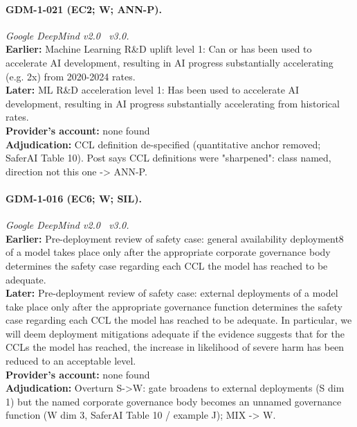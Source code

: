 \paragraph{GDM-1-021 (EC2; W; ANN-P).} \emph{Google DeepMind v2.0 \textrightarrow\ v3.0.}\\
\textbf{Earlier:} Machine Learning R\&D uplift level 1: Can or has been used to accelerate AI development, resulting in AI progress substantially accelerating (e.g. 2x) from 2020-2024 rates.\\
\textbf{Later:} ML R\&D acceleration level 1: Has been used to accelerate AI development, resulting in AI progress substantially accelerating from historical rates.\\
\textbf{Provider's account:} none found\\
\textbf{Adjudication:} CCL definition de-specified (quantitative anchor removed; SaferAI Table 10). Post says CCL definitions were "sharpened": class named, direction not this one -> ANN-P.

\paragraph{GDM-1-016 (EC6; W; SIL).} \emph{Google DeepMind v2.0 \textrightarrow\ v3.0.}\\
\textbf{Earlier:} Pre-deployment review of safety case: general availability deployment8 of a model takes place only after the appropriate corporate governance body determines the safety case regarding each CCL the model has reached to be adequate.\\
\textbf{Later:} Pre-deployment review of safety case: external deployments of a model take place only after the appropriate governance function determines the safety case regarding each CCL the model has reached to be adequate. In particular, we will deem deployment mitigations adequate if the evidence suggests that for the CCLs the model has reached, the increase in likelihood of severe harm has been reduced to an acceptable level.\\
\textbf{Provider's account:} none found\\
\textbf{Adjudication:} Overturn S->W: gate broadens to external deployments (S dim 1) but the named corporate governance body becomes an unnamed governance function (W dim 3, SaferAI Table 10 / example J); MIX -> W.

